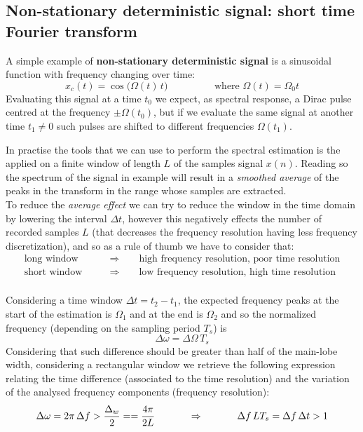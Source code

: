 	\subsection{Non-stationary deterministic signal: short time Fourier transform}
		
		A simple example of \textbf{non-stationary deterministic signal} is a sinusoidal function with frequency changing over time:
		\[ x_c(t) = \cos\big(\Omega(t)\,t\big)  \hspace{2cm} \text{where } \Omega(t) = \Omega_0 t \]
		Evaluating this signal at a time $t_0$ we expect, as spectral response, a Dirac pulse centred at the frequency $\pm \Omega(t_0)$, but if we evaluate the same signal at another time $t_1\neq 0$ such pulses are shifted to different frequencies $\Omega(t_1)$.
		
		In practise the tools that we can use to perform the spectral estimation is the \dft applied on a finite window of length $L$ of the samples signal $x(n)$. Reading so the spectrum of the signal in example will result in a \textit{smoothed average} of the peaks in the transform in the range whose samples are extracted.\\
		To reduce the \textit{average effect} we can try to reduce the window in the time domain by lowering the interval $\Delta t$, however this negatively effects the number of recorded samples $L$ (that decreases the frequency resolution having less frequency discretization), and so as a rule of thumb we have to consider that:
		\begin{align*}
			\text{long window} \qquad & \Rightarrow \qquad \text{high frequency resolution, poor time resolution} \\
			\text{short window} \qquad & \Rightarrow \qquad \text{low frequency resolution, high time resolution} \\
		\end{align*}
	
		Considering a time window $\Delta t = t_2-t_1$, the expected frequency peaks at the start of the estimation is $\Omega_1$ and at the end is $\Omega_2$ and so the normalized frequency (depending on the sampling period $T_s$) is
		\[  \Delta \omega = \Delta \Omega\, T_s \]
		Considering that such difference should be greater than half of the main-lobe width, considering a rectangular window we retrieve the following expression relating the time difference (associated to the time resolution) and the variation of the analysed frequency components (frequency resolution):
		\begin{equation}
			\Delta \omega = 2 \pi \, \Delta f > \frac{\Delta_w}{2} == \frac{4\pi}{2L} \hspace{1.2cm} \Rightarrow \hspace{1.2cm} \Delta f \, LT_s = \Delta f\, \Delta t > 1
		\end{equation}
		
